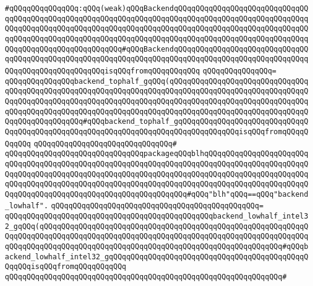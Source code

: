 \verb|#qQQqqQQqqQQqqQQq:qQQq(weak)qQQqBackendqQQqqQQqqQQqqQQqqQQqqQQqqQQqqQQqqQQqqQQqqQQqqQQqqQQqqQQqqQQqqQQqqQQqqQQqqQQqqQQqqQQqqQQqqQQqqQQqqQQqqQQqqQQqqQQqqQQqqQQqqQQqqQQqqQQqqQQqqQQqqQQqqQQqqQQqqQQqqQQqqQQqqQQqqQQqqQQqqQQqqQQqqQQqqQQqqQQqqQQqqQQqqQQqqQQqqQQqqQQqqQQqqQQqqQQqqQQqqQQqqQQqqQQqqQQqqQQqqQQqqQQqqQQq#qQQqBackendqQQqqQQqqQQqqQQqqQQqqQQqqQQqqQQqqQQqqQQqqQQqqQQqqQQqqQQqqQQqqQQqqQQqqQQqqQQqqQQqqQQqqQQqqQQqqQQqqQQqqQQqqQQqqQQqqQQqqQQqqQQqisqQQqfromqQQqqQQqqQQq|\newline
\verb|qQQqqQQqqQQqqQQq=|\newline
\verb|qQQqqQQqqQQqqQQqbackend_tophalf_gqQQq(qQQqqQQqqQQqqQQqqQQqqQQqqQQqqQQqqQQqqQQqqQQqqQQqqQQqqQQqqQQqqQQqqQQqqQQqqQQqqQQqqQQqqQQqqQQqqQQqqQQqqQQqqQQqqQQqqQQqqQQqqQQqqQQqqQQqqQQqqQQqqQQqqQQqqQQqqQQqqQQqqQQqqQQqqQQqqQQqqQQqqQQqqQQqqQQqqQQqqQQqqQQqqQQqqQQqqQQqqQQqqQQqqQQqqQQqqQQqqQQqqQQqqQQqqQQqqQQqqQQq#qQQqbackend_tophalf_gqQQqqQQqqQQqqQQqqQQqqQQqqQQqqQQqqQQqqQQqqQQqqQQqqQQqqQQqqQQqqQQqqQQqqQQqqQQqqQQqqQQqisqQQqfromqQQqqQQqqQQq|\newline
\verb|qQQqqQQqqQQqqQQqqQQqqQQqqQQqqQQq#|\newline
\verb|qQQqqQQqqQQqqQQqqQQqqQQqqQQqqQQqpackageqQQqblhqQQqqQQqqQQqqQQqqQQqqQQqqQQqqQQqqQQqqQQqqQQqqQQqqQQqqQQqqQQqqQQqqQQqqQQqqQQqqQQqqQQqqQQqqQQqqQQqqQQqqQQqqQQqqQQqqQQqqQQqqQQqqQQqqQQqqQQqqQQqqQQqqQQqqQQqqQQqqQQqqQQqqQQqqQQqqQQqqQQqqQQqqQQqqQQqqQQqqQQqqQQqqQQqqQQqqQQqqQQqqQQqqQQqqQQqqQQqqQQqqQQqqQQqqQQqqQQqqQQqqQQqqQQqqQQqqQQq#qQQq"blh"qQQq==qQQq"backend_lowhalf".|\newline
\verb|qQQqqQQqqQQqqQQqqQQqqQQqqQQqqQQqqQQqqQQqqQQqqQQq=|\newline
\verb|qQQqqQQqqQQqqQQqqQQqqQQqqQQqqQQqqQQqqQQqqQQqqQQqbackend_lowhalf_intel32_gqQQq(qQQqqQQqqQQqqQQqqQQqqQQqqQQqqQQqqQQqqQQqqQQqqQQqqQQqqQQqqQQqqQQqqQQqqQQqqQQqqQQqqQQqqQQqqQQqqQQqqQQqqQQqqQQqqQQqqQQqqQQqqQQqqQQqqQQqqQQqqQQqqQQqqQQqqQQqqQQqqQQqqQQqqQQqqQQqqQQqqQQqqQQqqQQqqQQqqQQq#qQQqbackend_lowhalf_intel32_gqQQqqQQqqQQqqQQqqQQqqQQqqQQqqQQqqQQqqQQqqQQqqQQqqQQqisqQQqfromqQQqqQQqqQQq|\newline
\verb|qQQqqQQqqQQqqQQqqQQqqQQqqQQqqQQqqQQqqQQqqQQqqQQqqQQqqQQqqQQqqQQq#|\newline
